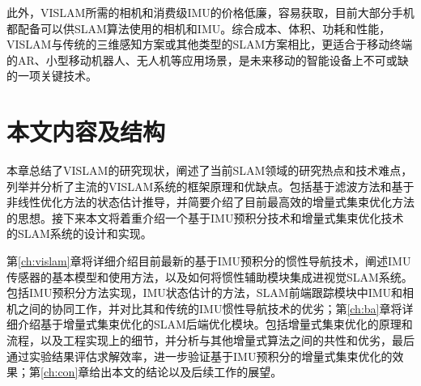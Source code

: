 此外，VISLAM所需的相机和消费级IMU的价格低廉，容易获取，目前大部分手机都配备可以供SLAM算法使用的相机和IMU。综合成本、体积、功耗和性能，VISLAM与传统的三维感知方案或其他类型的SLAM方案相比，更适合于移动终端的AR、小型移动机器人、无人机等应用场景，是未来移动的智能设备上不可或缺的一项关键技术。




\section{本文内容及结构}

本章总结了VISLAM的研究现状，阐述了当前SLAM领域的研究热点和技术难点，列举并分析了主流的VISLAM系统的框架原理和优缺点。包括基于滤波方法和基于非线性优化方法的状态估计推导，并简要介绍了目前最高效的增量式集束优化方法的思想。接下来本文将着重介绍一个基于IMU预积分技术和增量式集束优化技术的SLAM系统的设计和实现。

第\ref{ch:vislam}章将详细介绍目前最新的基于IMU预积分的惯性导航技术，阐述IMU传感器的基本模型和使用方法，以及如何将惯性辅助模块集成进视觉SLAM系统。包括IMU预积分方法实现，IMU状态估计的方法，SLAM前端跟踪模块中IMU和相机之间的协同工作，并对比其和传统的IMU惯性导航技术的优劣；第\ref{ch:ba}章将详细介绍基于增量式集束优化的SLAM后端优化模块。包括增量式集束优化的原理和流程，以及工程实现上的细节，并分析与其他增量式算法之间的共性和优劣，最后通过实验结果评估求解效率，进一步验证基于IMU预积分的增量式集束优化的效果；第\ref{ch:con}章给出本文的结论以及后续工作的展望。
